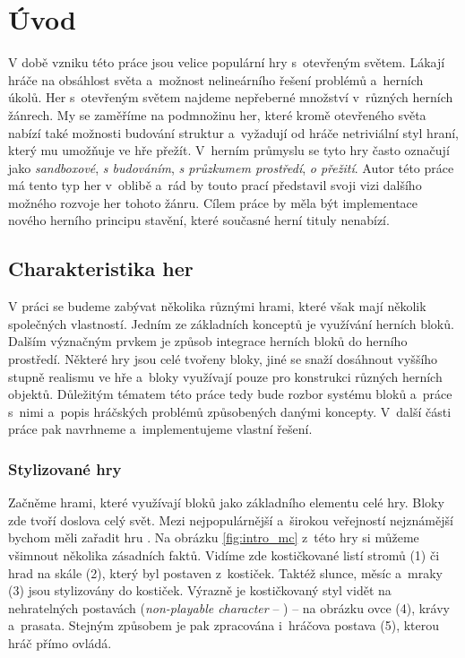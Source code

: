 
\chapter{Úvod}
\label{chap:uvod}

V době vzniku této práce jsou velice populární hry s~otevřeným světem. Lákají hráče na obsáhlost světa a~možnost nelineárního řešení problémů a~herních úkolů. Her s~otevřeným světem najdeme nepřeberné množství v~různých herních žánrech. My se zaměříme na podmnožinu her, které kromě otevřeného světa nabízí také možnosti budování struktur a~vyžadují od hráče netriviální styl hraní, který mu umožňuje ve hře přežít. V~herním průmyslu se tyto hry často označují jako \textit{sandboxové}, \textit{s budováním}, \textit{s průzkumem prostředí}, \textit{o přežití}. Autor této práce má tento typ her v~oblibě a~rád by touto prací představil svoji vizi dalšího možného rozvoje her tohoto žánru. Cílem práce by měla být implementace nového herního principu stavění, které současné herní tituly nenabízí.

\section{Charakteristika her}
V práci se budeme zabývat několika různými hrami, které však mají několik společných vlastností. Jedním ze základních konceptů je využívání herních bloků. Dalším význačným prvkem je způsob integrace herních bloků do herního prostředí. Některé hry jsou celé tvořeny bloky, jiné se snaží dosáhnout vyššího stupně realismu ve hře a~bloky využívají pouze pro konstrukci různých herních objektů. Důležitým tématem této práce tedy bude rozbor systému bloků a~práce s~nimi a~popis hráčských problémů způsobených danými koncepty. V~další části práce pak navrhneme a~implementujeme vlastní řešení.




\subsection{Stylizované hry}
Začněme hrami, které využívají bloků jako základního elementu celé hry. Bloky zde tvoří doslova celý svět. Mezi nejpopulárnější a~širokou veřejností nejznámější bychom měli zařadit hru \MC{}. Na obrázku \ref{fig:intro_mc} z~této hry si můžeme všimnout několika zásadních faktů. Vidíme zde kostičkované listí stromů (1) či hrad na skále (2), který byl postaven z~kostiček. Taktéž slunce, měsíc a~mraky (3) jsou stylizovány do kostiček. Výrazně je kostičkovaný styl vidět na nehratelných postavách (\textit{non-playable character} -- \NPC{}) -- na obrázku ovce (4), krávy a~prasata. Stejným způsobem je pak zpracována i~hráčova postava (5), kterou hráč přímo ovládá.

